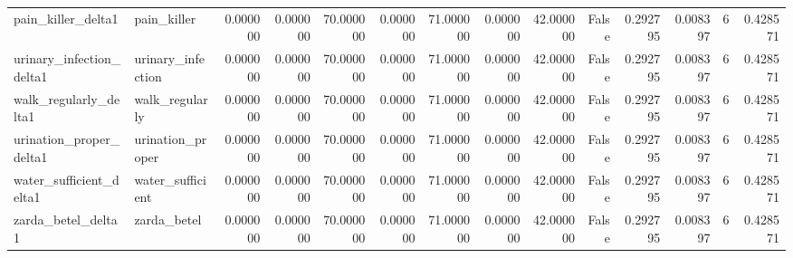 \begin{longtable}{llrrrrrrrrrrrr}
pain\_killer\_delta1 & pain\_killer & 0.000000 & 0.000000 & 70.000000 & 0.000000 & 71.000000 & 0.000000 & 42.000000 & False & 0.292795 & 0.008397 & 6 & 0.428571 \\
urinary\_infection\_delta1 & urinary\_infection & 0.000000 & 0.000000 & 70.000000 & 0.000000 & 71.000000 & 0.000000 & 42.000000 & False & 0.292795 & 0.008397 & 6 & 0.428571 \\
walk\_regularly\_delta1 & walk\_regularly & 0.000000 & 0.000000 & 70.000000 & 0.000000 & 71.000000 & 0.000000 & 42.000000 & False & 0.292795 & 0.008397 & 6 & 0.428571 \\
urination\_proper\_delta1 & urination\_proper & 0.000000 & 0.000000 & 70.000000 & 0.000000 & 71.000000 & 0.000000 & 42.000000 & False & 0.292795 & 0.008397 & 6 & 0.428571 \\
water\_sufficient\_delta1 & water\_sufficient & 0.000000 & 0.000000 & 70.000000 & 0.000000 & 71.000000 & 0.000000 & 42.000000 & False & 0.292795 & 0.008397 & 6 & 0.428571 \\
zarda\_betel\_delta1 & zarda\_betel & 0.000000 & 0.000000 & 70.000000 & 0.000000 & 71.000000 & 0.000000 & 42.000000 & False & 0.292795 & 0.008397 & 6 & 0.428571 \\
\end{longtable}
